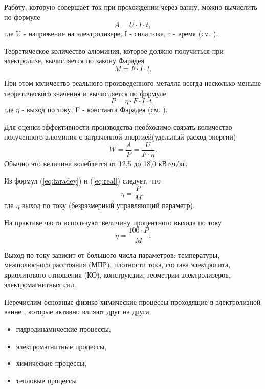 \documentclass{article}
\begin{document}
Работу, которую совершает ток при прохождении через ванну, можно вычислить по формуле
\begin{equation}
 A=U \cdot I \cdot t,
\end{equation}
где U - напряжение на электролизере, I - сила тока, t - время (см. \cite{litlink:derkach}).

Теоретическое количество алюминия, которое должно получиться при электролизе, вычисляется по закону Фарадея
\begin{equation}\label{eq:faradey}
M=F \cdot I \cdot t.
\end{equation}

При этом количество реального произведенного металла всегда несколько меньше теоретического значения и вычисляется по формуле 
\begin{equation}\label{eq:real}
P=\eta \cdot F \cdot I \cdot t,
\end{equation}
где $\eta$ - выход по току, F - константа Фарадея (см. \cite{litlink:derkach}).

Для оценки эффективности производства необходимо связать количество полученного алюминия с затраченной энергией(удельный расход энергии)
\begin{equation}
W=\frac{A}{P}=\frac{U}{F \cdot \eta}.
\end{equation}
Обычно это величина колеблется от 12,5 до 18,0 кВт$\cdot$ч/кг. 

Из формул (\ref{eq:faradey}) и (\ref{eq:real}) следует, что
\begin{equation*}
\eta=\frac{P}{M},
\end{equation*}
где $\eta$ выход по току (безразмерный управляющий параметр).

На практике часто используют величину процентного выхода по току
\begin{equation}
\eta=\frac{100 \cdot P}{M}.
\end{equation}

Выход по току зависит от большого числа параметров: температуры, межполюсного расстояния (МПР), плотности тока, состава электролита, криолитового отношения (КО), конструкции, геометрии электролизеров, электромагнитных сил.

Перечислим основные физико-химические процессы проходящие в электролизной ванне \cite{litlink:kalmykov}, которые активно влияют друг на друга:
\begin{itemize}
\item гидродинамические процессы,
\item электромагнитные процессы,
\item химические процессы,
\item тепловые процессы
\end{itemize}
\end{document}
